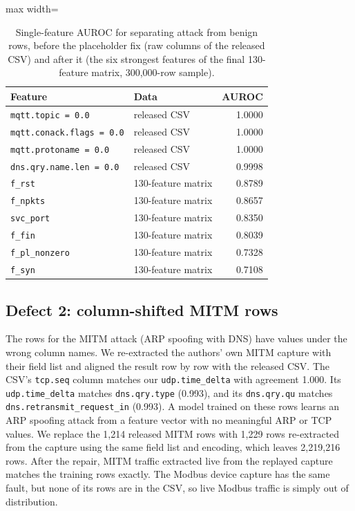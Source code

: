 \begin{table}[t]
\centering
\caption{Single-feature AUROC for separating attack from benign rows, before the placeholder fix (raw columns of the released CSV) and after it (the six strongest features of the final 130-feature matrix, 300,000-row sample).}
\label{tab:auroc}
\small
\begin{adjustbox}{max width=\linewidth}
\begin{tabular}{llr}
\toprule
Feature & Data & AUROC \\
\midrule
\texttt{mqtt.topic = 0.0} & released CSV & 1.0000 \\
\texttt{mqtt.conack.flags = 0.0} & released CSV & 1.0000 \\
\texttt{mqtt.protoname = 0.0} & released CSV & 1.0000 \\
\texttt{dns.qry.name.len = 0.0} & released CSV & 0.9998 \\
\midrule
\texttt{f\_rst} & 130-feature matrix & 0.8789 \\
\texttt{f\_npkts} & 130-feature matrix & 0.8657 \\
\texttt{svc\_port} & 130-feature matrix & 0.8350 \\
\texttt{f\_fin} & 130-feature matrix & 0.8039 \\
\texttt{f\_pl\_nonzero} & 130-feature matrix & 0.7328 \\
\texttt{f\_syn} & 130-feature matrix & 0.7108 \\
\bottomrule
\end{tabular}
\end{adjustbox}
\end{table}

\subsection{Defect 2: column-shifted MITM rows}
The rows for the MITM attack (ARP spoofing with DNS) have values under the wrong column names. We re-extracted the authors' own MITM capture with their field list and aligned the result row by row with the released CSV. The CSV's \texttt{tcp.seq} column matches our \texttt{udp.time\_delta} with agreement 1.000. Its \texttt{udp.time\_delta} matches \texttt{dns.qry.type} (0.993), and its \texttt{dns.qry.qu} matches \texttt{dns.retransmit\_request\_in} (0.993). A model trained on these rows learns an ARP spoofing attack from a feature vector with no meaningful ARP or TCP values. We replace the 1,214 released MITM rows with 1,229 rows re-extracted from the capture using the same field list and encoding, which leaves 2,219,216 rows. After the repair, MITM traffic extracted live from the replayed capture matches the training rows exactly. The Modbus device capture has the same fault, but none of its rows are in the CSV, so live Modbus traffic is simply out of distribution.

